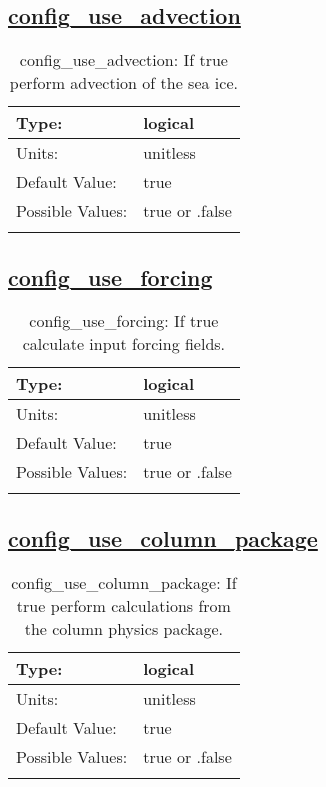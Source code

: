 \subsection[config\_use\_advection]{\hyperref[sec:nm_tab_use_sections]{config\_use\_advection}}
\label{subsec:nm_sec_config_use_advection}
\begin{center}
\begin{longtable}{| p{2.0in} || p{4.0in} |}
    \hline
    Type: & logical \\
    \hline
    Units: & \si{unitless} \\
    \hline
    Default Value: & true \\
    \hline
    Possible Values: & true or .false \\
    \hline
    \caption{config\_use\_advection: If true perform advection of the sea ice.}
\end{longtable}
\end{center}
\subsection[config\_use\_forcing]{\hyperref[sec:nm_tab_use_sections]{config\_use\_forcing}}
\label{subsec:nm_sec_config_use_forcing}
\begin{center}
\begin{longtable}{| p{2.0in} || p{4.0in} |}
    \hline
    Type: & logical \\
    \hline
    Units: & \si{unitless} \\
    \hline
    Default Value: & true \\
    \hline
    Possible Values: & true or .false \\
    \hline
    \caption{config\_use\_forcing: If true calculate input forcing fields.}
\end{longtable}
\end{center}
\subsection[config\_use\_column\_package]{\hyperref[sec:nm_tab_use_sections]{config\_use\_column\_package}}
\label{subsec:nm_sec_config_use_column_package}
\begin{center}
\begin{longtable}{| p{2.0in} || p{4.0in} |}
    \hline
    Type: & logical \\
    \hline
    Units: & \si{unitless} \\
    \hline
    Default Value: & true \\
    \hline
    Possible Values: & true or .false \\
    \hline
    \caption{config\_use\_column\_package: If true perform calculations from the column physics package.}
\end{longtable}
\end{center}
